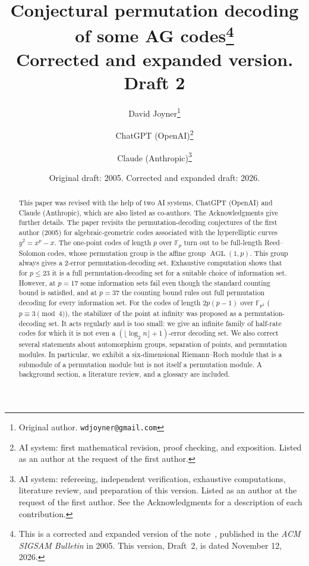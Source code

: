 \documentclass[12pt,letterpaper]{article}
\theoremstyle{definition}
\theoremstyle{remark}
\numberwithin{equation}{section}
\newcommand{\F}{\mathbb{F}}
\newcommand{\AGL}{\operatorname{AGL}}
\begin{document}
\title{Conjectural permutation decoding of some AG codes\thanks{This is a
corrected and expanded version of the note~\cite{Jo05}, published in the
\emph{ACM SIGSAM Bulletin} in 2005. This version, Draft~2, is dated
November 12, 2026.}\\[4pt]
\large Corrected and expanded version. Draft 2}
\author{David Joyner\thanks{Original author. \texttt{wdjoyner@gmail.com}}
\and ChatGPT (OpenAI)\thanks{AI system: first mathematical revision,
proof checking, and exposition.  Listed as an author at the request
of the first author.}
\and Claude (Anthropic)\thanks{AI system: refereeing, independent
verification, exhaustive computations, literature review, and preparation
of this version.  Listed as an author at the request of the first author.
See the Acknowledgments for a description of each contribution.}}
\date{Original draft: 2005. Corrected and expanded draft: 2026.}
\maketitle

\begin{abstract}
This paper was revised with the help of two AI systems, ChatGPT (OpenAI)
and Claude (Anthropic), which are also listed as co-authors. The
Acknowledgments give further details.
The paper revisits the permutation-decoding conjectures of
the first author (2005) for algebraic-geometric codes associated with the
hyperelliptic curves $y^2=x^p-x$.  The one-point codes of length $p$ over
$\F_p$ turn out to be full-length Reed--Solomon codes, whose permutation
group is the affine group $\AGL(1,p)$.  This group always gives a
$2$-error permutation-decoding set.  Exhaustive computation shows that for
$p\le 23$ it is a full permutation-decoding set for a suitable choice of
information set.  However, at $p=17$ some information sets fail even
though the standard counting bound is satisfied, and at $p=37$ the
counting bound rules out full permutation decoding for every information
set.  For the codes of length $2p(p-1)$ over $\F_{p^2}$
($p\equiv3\pmod4$), the stabilizer of the point at infinity was proposed
as a permutation-decoding set.  It acts regularly and is too small: we
give an infinite family of half-rate codes for which it is not even a
$(\lfloor\log_2 n\rfloor+1)$-error decoding set.  We also correct several
statements about automorphism groups, separation of points, and
permutation modules.  In particular, we exhibit a six-dimensional
Riemann--Roch module that is a submodule of a permutation module but is
not itself a permutation module.  A background section, a literature
review, and a glossary are included.
\end{abstract}
\end{document}
